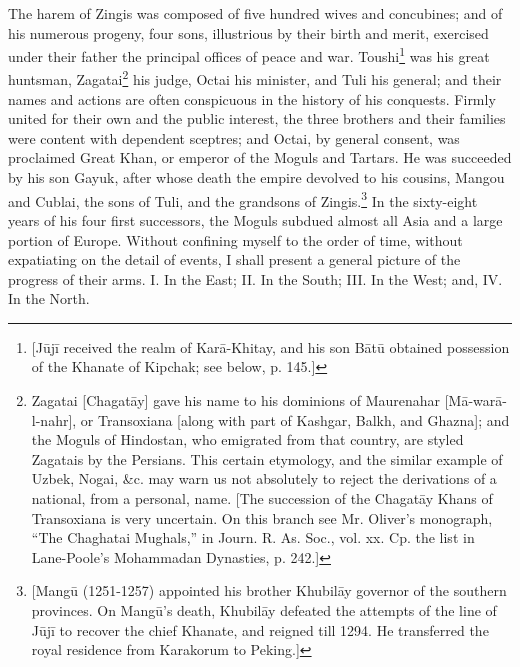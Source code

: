 The harem of Zingis was composed of five hundred wives and concubines; and of his numerous progeny, four sons, illustrious by their birth and merit, exercised under their father the principal offices of peace and war. Toushi\footnote{[Jūjī received the realm of Karā-Khitay, and his son Bātū obtained possession of the Khanate of Kipchak; see below, p. 145.]} was his great huntsman, Zagatai\footnote{Zagatai [Chagatāy] gave his name to his dominions of Maurenahar [Mā-warā-l-nahr], or Transoxiana [along with part of Kashgar, Balkh, and Ghazna]; and the Moguls of Hindostan, who emigrated from that country, are styled Zagatais by the Persians. This certain etymology, and the similar example of Uzbek, Nogai, \&c. may warn us not absolutely to reject the derivations of a national, from a personal, name. [The succession of the Chagatāy Khans of Transoxiana is very uncertain. On this branch see Mr. Oliver\texthebrew{}’s monograph, \texthebrew{“}The Chaghatai Mughals,\texthebrew{}” in Journ. R. As. Soc., vol. xx. Cp. the list in Lane-Poole\texthebrew{}’s Mohammadan Dynasties, p. 242.]} his judge, Octai his minister, and Tuli his general; and their names and actions are often conspicuous in the history of his conquests. Firmly united for their own and the public interest, the three brothers and their families were content with dependent sceptres; and Octai, by general consent, was proclaimed Great Khan, or emperor of the Moguls and Tartars. He was succeeded by his son Gayuk, after whose death the empire devolved to his cousins, Mangou and Cublai, the sons of Tuli, and the grandsons of Zingis.\footnote{[Mangū (1251-1257) appointed his brother Khubilāy governor of the southern provinces. On Mangū\texthebrew{}’s death, Khubilāy defeated the attempts of the line of Jūjī to recover the chief Khanate, and reigned till 1294. He transferred the royal residence from Karakorum to Peking.]} In the sixty-eight years of his four first successors, the Moguls subdued almost all Asia and a large portion of Europe. Without confining myself to the order of time, without expatiating on the detail of events, I shall present a general picture of the progress of their arms. I. In the East; II. In the South; III. In the West; and, IV. In the North.

